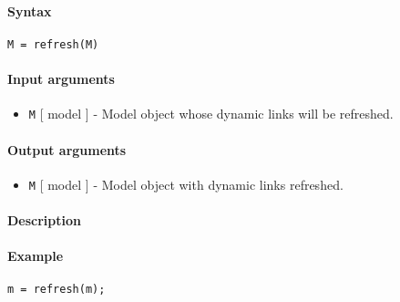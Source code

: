 


	\paragraph{Syntax}\label{syntax}

\begin{verbatim}
M = refresh(M)
\end{verbatim}

\paragraph{Input arguments}\label{input-arguments}

\begin{itemize}
\itemsep1pt\parskip0pt
\item
  \texttt{M} {[} model {]} - Model object whose dynamic links will be
  refreshed.
\end{itemize}

\paragraph{Output arguments}\label{output-arguments}

\begin{itemize}
\itemsep1pt\parskip0pt
\item
  \texttt{M} {[} model {]} - Model object with dynamic links refreshed.
\end{itemize}

\paragraph{Description}\label{description}

\paragraph{Example}\label{example}

\begin{verbatim}
m = refresh(m);
\end{verbatim}


